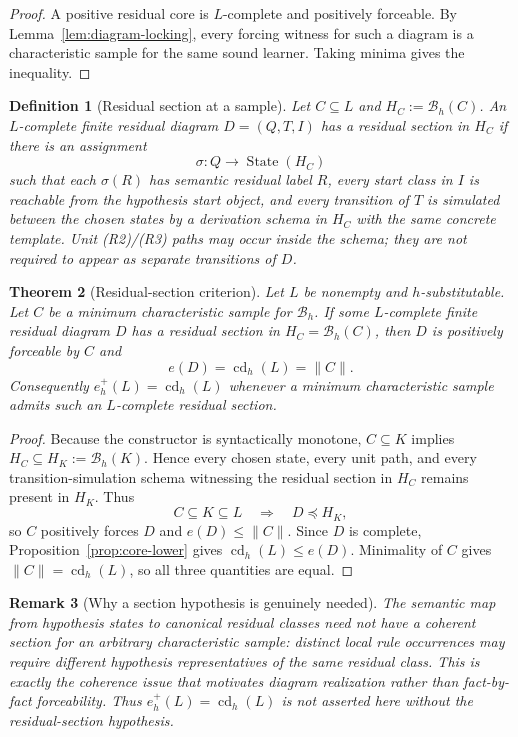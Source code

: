 \documentclass[11pt]{article}
\newtheorem{definition}{Definition}[section]
\newtheorem{theorem}[definition]{Theorem}
\newtheorem{remark}[definition]{Remark}
\newcommand{\cd}{\operatorname{cd}}
\newcommand{\B}{\mathcal B}
\begin{document}
\begin{proof}
A positive residual core is $L$-complete and positively forceable.  By
Lemma~\ref{lem:diagram-locking}, every forcing witness for such a diagram is a
characteristic sample for the same sound learner.  Taking minima gives the
inequality.
\end{proof}

\begin{definition}[Residual section at a sample]
\label{def:residual-section}
Let $C\subseteq L$ and $H_C:=\B_h(C)$.  An $L$-complete finite residual
diagram $D=(Q,T,I)$ has a \emph{residual section in $H_C$} if there is an
assignment
\[
 \sigma:Q\to\operatorname{State}(H_C)
\]
such that each $\sigma(R)$ has semantic residual label $R$, every start class
in $I$ is reachable from the hypothesis start object, and every transition of
$T$ is simulated between the chosen states by a derivation schema in $H_C$
with the same concrete template.  Unit (R2)/(R3) paths may occur inside the
schema; they are not required to appear as separate transitions of $D$.
\end{definition}

\begin{theorem}[Residual-section criterion]
\label{thm:section-criterion}
Let $L$ be nonempty and $h$-substitutable.  Let $C$ be a minimum
characteristic sample for $\B_h$.  If some $L$-complete finite residual
diagram $D$ has a residual section in $H_C=\B_h(C)$, then $D$ is positively
forceable by $C$ and
\[
 \boxed{e(D)=\cd_h(L)=\|C\|.}
\]
Consequently $e_h^+(L)=\cd_h(L)$ whenever a minimum characteristic sample
admits such an $L$-complete residual section.
\end{theorem}

\begin{proof}
Because the constructor is syntactically monotone, $C\subseteq K$ implies
$H_C\subseteq H_K:=\B_h(K)$.  Hence every chosen state, every unit path, and
every transition-simulation schema witnessing the residual section in $H_C$
remains present in $H_K$.  Thus
\[
 C\subseteq K\subseteq L\quad\Longrightarrow\quad D\preceq H_K,
\]
so $C$ positively forces $D$ and $e(D)\le\|C\|$.  Since $D$ is complete,
Proposition~\ref{prop:core-lower} gives
$\cd_h(L)\le e(D)$.  Minimality of $C$ gives $\|C\|=\cd_h(L)$, so all three
quantities are equal.
\end{proof}

\begin{remark}[Why a section hypothesis is genuinely needed]
The semantic map from hypothesis states to canonical residual classes need not
have a coherent section for an arbitrary characteristic sample: distinct local
rule occurrences may require different hypothesis representatives of the same
residual class.  This is exactly the coherence issue that motivates diagram
realization rather than fact-by-fact forceability.  Thus
\(e_h^+(L)=\cd_h(L)\) is not asserted here without the residual-section
hypothesis.
\end{remark}
\end{document}

